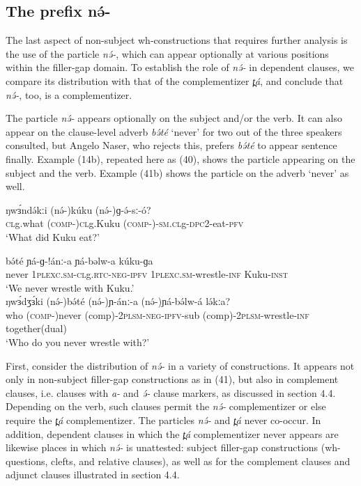 \subsection{The prefix nə́-}
The last aspect of non-subject wh-constructions that requires further analysis is the use of the particle \textit{nə́-}, which can appear optionally at various positions within the filler-gap domain. To establish the role of \textit{nə́-} in dependent clauses, we compare its distribution with that of the complementizer \textit{t̪á}, and conclude that \textit{nə́-}, too, is a complementizer.

The particle \textit{nə́-} appears optionally on the subject and/or the verb. It can also appear on the clause-level adverb \textit{bə́té} ‘never’ for two out of the three speakers consulted, but Angelo Naser, who rejects this, prefers \textit{bə́té} to appear sentence finally. Example (14b), repeated here as (40), shows the particle appearing on the subject and the verb.  Example (41b) shows the particle on the adverb ‘never’ as well.

\ea
\gll	ŋwɜ́ndə́kːi	(nə́-)kúku	(nə́-)ɡ-ə́-sː-ó?\\
	\textsc{cl}g.what	(\textsc{comp-})\textsc{cl}g.Kuku	(\textsc{comp-})-\textsc{sm.cl}g-\textsc{dpc}2-eat-\textsc{pfv}	\\
\trans	‘What did Kuku eat?’\\
\z

\ea
\ea \gll	bə́té	ɲá-ɡ-!ánː-a	ɲá-bəlw-a          	kúku-ɡa\\
	never   1\textsc{plexc.sm}-\textsc{cl}g.\textsc{rtc}-\textsc{neg}-\textsc{ipfv} 1\textsc{plexc.sm}-wrestle-\textsc{inf}	Kuku-\textsc{inst}\\
\trans		‘We never wrestle with Kuku.’\\
\ex \gll	ŋwɜ́dʒɜ́ki	(nə́-)bə́té	(nə́-)ɲ-ánː-a	 (nə́-)ɲá-bə́lw-á	lə́kːa?  	   \\
		    	who	        (\textsc{comp-})never     (comp)-2\textsc{plsm}-\textsc{neg}-\textsc{ipfv}-sub	
			(comp)-2\textsc{plsm}-wrestle-\textsc{inf}	together(dual)\\
\trans		‘Who do you never wrestle with?’
\z
\z

First, consider the distribution of \textit{nə́-} in a variety of constructions. It appears not only in non-subject filler-gap constructions as in (41), but also in complement clauses, i.e. clauses with \textit{a-} and \textit{ə́-} clause markers, as discussed in section 4.4.  Depending on the verb, such clauses permit the \textit{nə́-} complementizer or else require the \textit{t̪á} complementizer.  The particles \textit{nə́-} and \textit{t̪á} never co-occur.  In addition, dependent clauses in which the \textit{t̪á} complementizer never appears are likewise places in which \textit{nə́-} is unattested:  subject filler-gap constructions (wh-questions, clefts, and relative clauses), as well as for the complement clauses and adjunct clauses illustrated in section 4.4. 

